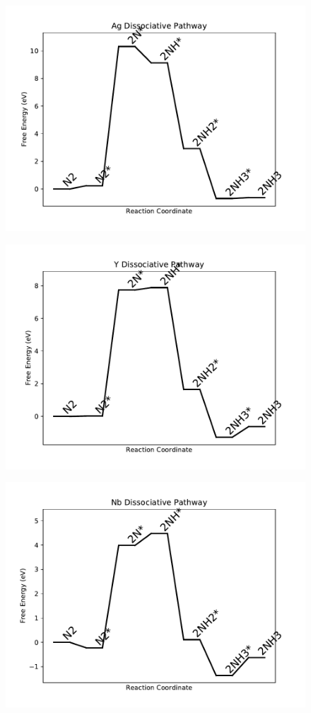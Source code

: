 \begin{figure}
\includegraphics[width=0.8\linewidth]{data/plots/Ag_dissociative.pdf}
\label{fig:Ag_dissociative}
\end{figure}

\begin{figure}
\includegraphics[width=0.8\linewidth]{data/plots/Y_dissociative.pdf}
\label{fig:Y_dissociative}
\end{figure}

\begin{figure}
\includegraphics[width=0.8\linewidth]{data/plots/Nb_dissociative.pdf}
\label{fig:Nb_dissociative}
\end{figure}

